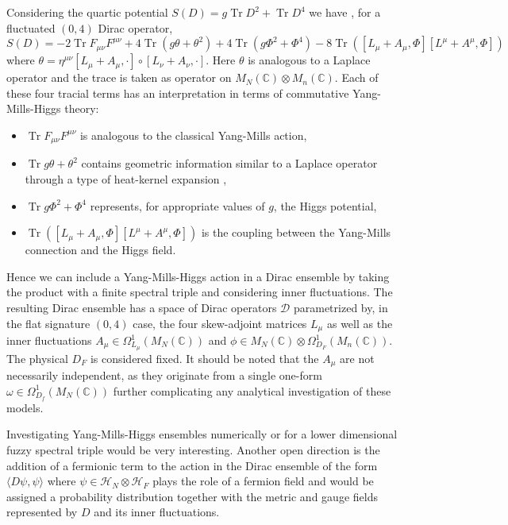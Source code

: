 \documentclass[10pt]{article}
\DeclareMathOperator{\tr}{Tr}
\begin{document}
Considering the quartic potential $S(D) = g \tr D^2 + \tr D^4$ we have \cite{Sanchez3}, for a fluctuated $(0, 4)$ Dirac operator,
$$
  S(D) = -2\tr F_{\mu\nu}F^{\mu\nu} + 4\tr(g \theta + \theta^2) + 4\tr(g\Phi^2 + \Phi^4) - 8\tr([L_\mu + A_\mu, \Phi][L^\mu + A^\mu, \Phi])
$$
where $\theta = \eta^{\mu \nu}[L_\mu + A_\mu, \cdot ] \circ [L_\nu + A_\nu, \cdot]$. Here $\theta$ is analogous to a Laplace operator and the trace is taken as operator on $M_N(\mathbb{C}) \otimes M_n(\mathbb{C})$.
Each of these four tracial terms has an interpretation in terms of commutative Yang-Mills-Higgs theory:
\begin{itemize}
  \item $\tr F_{\mu\nu}F^{\mu\nu}$ is analogous to the classical Yang-Mills action,
  \item $\tr g\theta + \theta^2$ contains geometric information similar to a Laplace operator through a type of heat-kernel expansion \cite{Spectral estimators},
  \item $\tr g\Phi^2 + \Phi^4$ represents, for appropriate values of $g$, the Higgs potential,
  \item $\tr ([L_\mu + A_\mu, \Phi][L^\mu + A^\mu, \Phi])$ is the coupling between the Yang-Mills connection and the Higgs field.
\end{itemize}

Hence we can include a Yang-Mills-Higgs action in a Dirac ensemble by taking the product with a finite spectral triple and considering inner fluctuations.
The resulting Dirac ensemble has a space of Dirac operators $\mathcal{D}$ parametrized by, in the flat signature $(0,4)$ case, the four skew-adjoint matrices $L_\mu$ as well as the inner fluctuations $A_\mu \in \Omega^1_{L_\mu}(M_N(\mathbb{C}))$ and  $\phi \in M_N(\mathbb{C}) \otimes \Omega^1_{D_F}(M_n(\mathbb{C}))$.
The physical $D_F$ is considered fixed.
It should be noted that the $A_\mu$ are not necessarily independent, as they originate from a single one-form $\omega \in \Omega^1_{D_f}(M_N(\mathbb{C}))$ further complicating any analytical investigation of these models.

Investigating Yang-Mills-Higgs ensembles numerically or for a lower dimensional fuzzy spectral triple would be very interesting.
Another open direction is the addition of a fermionic term to the action in the Dirac ensemble of the form $\langle D \psi, \psi \rangle$ where $\psi \in \mathcal{H}_N \otimes \mathcal{H}_F$ plays the role of a fermion field and would be assigned a probability distribution together with the metric and gauge fields represented by $D$ and its inner fluctuations.
\end{document}
